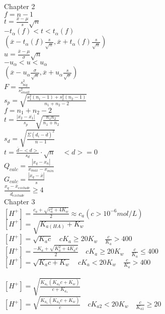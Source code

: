 \documentclass[10pt,twocolumn]{article}
\begin{document}
    \noindent
    Chapter 2 \\
    \(f = n - 1\)\\
    \(t=\frac{\overline{x}-\mu}{s} \sqrt{n} \)\\
    \(-t_\alpha (f)<t<t_\alpha (f)\) \\
    \((\overline{x}-t_\alpha (f) \frac{s}{\sqrt{n}},\overline{x}+t_\alpha (f) \frac{s}{\sqrt{n}})\)\\
    \(u=\frac{\overline{x}-\mu}{\sigma } \sqrt{n} \)\\
    \(-u_\alpha <u<u_\alpha\) \\
    \((\overline{x}-u_\alpha \frac{\sigma }{\sqrt{n}},\overline{x}+u_\alpha \frac{s}{\sqrt{\sigma }})\)\\
    \(F=\frac{s_{big}^2}{s_{small}^2}\) \\
    \(s_p=\sqrt{\frac{s_1^2(n_1-1)+s_2^2(n_2-1)}{n_1+n_2-2}}\) \\
    \(f=n_1+n_2-2\)\\
    \(t=\frac{|\overline{x_2}-\overline{x_1}|}{s_p}\sqrt{\frac{n_1n_2}{n_1+n_2}}\) \\
    \(s_d=\sqrt{\frac{\Sigma (d_i - \overline{d})^2}{n-1}}\) \\
    \(t = \frac{\overline{d} - <d>}{s_d} \cdot \sqrt{n} \quad <d>=0\)\\
    \(Q_{calc}=\frac{|x_q-x_n|}{x_{max}-x_{min}}\) \\
    \(G_{calc}=\frac{|x_q-\overline{x}|}{s}\) \\
    \(\frac{x_q-\overline{x}_{exclude}}{\overline{d}_{exclude}} \geq 4\)\\
    Chapter 3\\
    \([H^+] = \frac{c_a+\sqrt{c_a^2+4K_w}}{2} \approx c_a(c>10^{-6} mol/L)\) \\
    \([H^+] = \sqrt{K_{a(HA)}+K_w}\) \\
    \([H^+] = \sqrt{K_ac} \quad cK_a \geq 20K_w \quad \frac{c}{K_a}>400\) \\
    \([H^+] = \frac{-K_a+\sqrt{K_a^2+4K_ac}}{2} \quad cK_a \geq 20K_w \quad \frac{c}{K_a} \leq 400\) \\
    \([H^+] = \sqrt{K_ac+K_w}\quad cK_a < 20K_w \quad \frac{c}{K_a} > 400\) \\
    \\ \([H^+] = \sqrt{\frac{K_{a_1}(K_{a_2}c+K_w)}{c+K_{a_1}}}\) \\
    \([H^+] = \sqrt{\frac{K_{a_1}(K_{a_2}c+K_w)}{c}} \quad cK_{a2} < 20K_w \quad \frac{c}{K_{a1}}\geq 20\) \\
\end{document}
